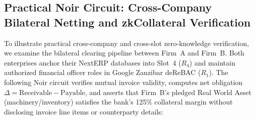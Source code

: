 \documentclass[a4paper,11pt,twoside,parskip=half-,headings=small]{scrartcl}
\begin{document}
\clearpage
\subsection{Practical Noir Circuit: Cross-Company Bilateral Netting and zkCollateral Verification}
\label{sec:noir_netting_circuit}

To illustrate practical cross-company and cross-slot zero-knowledge verification, we examine the bilateral
clearing pipeline between Firm~A and Firm~B. Both enterprises anchor their NextERP databases into Slot~4 ($R_4$)
and maintain authorized financial officer roles in Google Zanzibar deReBAC ($R_1$).
The following Noir circuit verifies mutual invoice validity, computes net obligation $\Delta = \text{Receivable} - \text{Payable}$,
and asserts that Firm~B's pledged Real World Asset (machinery/inventory) satisfies the bank's 125\% collateral margin
without disclosing invoice line items or counterparty details:
\end{document}
